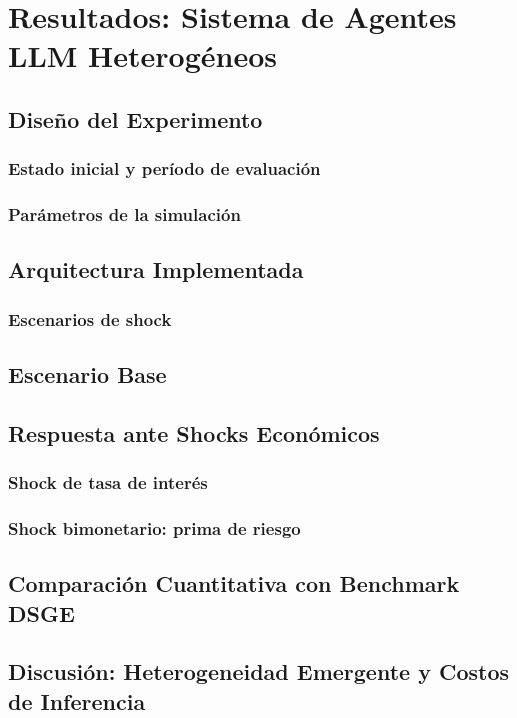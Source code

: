 
\chapter{Resultados: Sistema de Agentes LLM Heterogéneos}
\label{chap:resultados-agentes}

\section{Diseño del Experimento}
\label{sec:experimento-llm}

\subsection{Estado inicial y período de evaluación}
\label{subsec:estado-inicial}

\subsection{Parámetros de la simulación}
\label{subsec:parametros-sim}

\section{Arquitectura Implementada}
\label{sec:arquitectura-impl}

\subsection{Escenarios de shock}
\label{subsec:escenarios-shock}

\section{Escenario Base}
\label{sec:resultados-baseline}

\section{Respuesta ante Shocks Económicos}
\label{sec:respuesta-shocks}

\subsection{Shock de tasa de interés}
\label{subsec:shock-tasa-llm}

\subsection{Shock bimonetario: prima de riesgo}
\label{subsec:shock-bimonetario-llm}

\section{Comparación Cuantitativa con Benchmark DSGE}
\label{sec:comparacion-cuantitativa}

\section{Discusión: Heterogeneidad Emergente y Costos de Inferencia}
\label{sec:discusion-llm}
